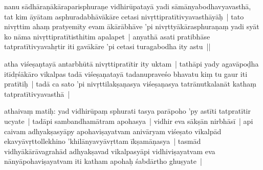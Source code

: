 \documentclass[article,12pt,a4paper]{memoir}
\begin{document}
	  \pstart nanu sādhāraṇākāraparisphuraṇe vidhirūpatayā yadi sāmānyabodhavyavasthā, tat kim āyātam asphuradabhāvākāre cetasi nivṛttipratītivyavasthāyāḥ | tato nivṛttim ahaṃ pratyemīty evam ākārābhāve 'pi nivṛttyākārasphuraṇaṃ yadi syāt ko nāma nivṛttipratītisthitim apalapet | anyathā asati pratibhāse tatpratītivyavahṛtir iti gavākāre 'pi cetasi turagabodha ity astu ||
	\pend
      

	  \pstart atha viśeṣaṇtayā antarbhūtā nivṛttipratītir ity uktam | tathāpi yady agavāpoḍha itīdṛśākāro vikalpas tadā viśeṣaṇatayā tadanupraveśo bhavatu kiṃ tu gaur iti pratītiḥ | tadā ca sato 'pi nivṛttilakṣaṇasya viśeṣaṇasya tatrānutkalanāt kathaṃ tatpratītivyavasthā |
	\pend
      

	  \pstart athaivaṃ matiḥ: yad vidhirūpaṃ sphurati tasya parāpoho 'py astīti tatpratītir ucyate | tadāpi sambandhamātram apohasya | vidhir eva sākṣān nirbhāsī | api caivam adhyakṣasyāpy apohaviṣayatvam anivāryam viśeṣato vikalpād ekavyāvṛttollekhino 'khilānyavyāvṛttam īkṣamāṇasya | tasmād vidhyākārāvagrahād adhyakṣavad vikalpasyāpi vidhiviṣayatvam eva nānyāpohaviṣayatvam iti katham apohaḥ śabdārtho ghuṣyate | 
	\pend
      
\end{document}
